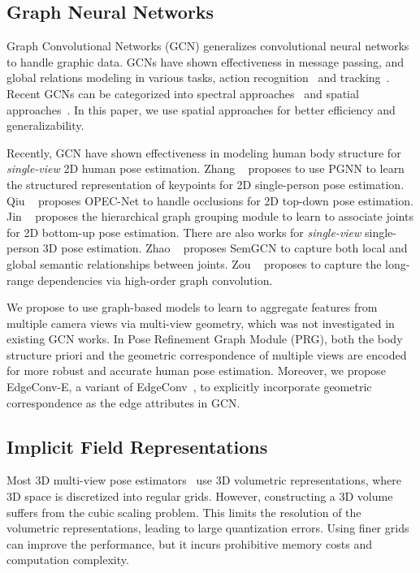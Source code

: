 \documentclass[10pt,twocolumn,letterpaper]{article}
\begin{document}
\subsection{Graph Neural Networks}

Graph Convolutional Networks (GCN) generalizes convolutional neural networks to handle graphic data. GCNs have shown effectiveness in message passing, and global relations modeling in various tasks, \eg action recognition~\cite{yan2018spatial} and tracking~\cite{gao2019graph}. Recent GCNs can be categorized into spectral approaches~\cite{bruna2013spectral,kipf2016semi} and spatial approaches~\cite{duvenaud2015convolutional,wang2019dynamic}. In this paper, we use spatial approaches for better efficiency and generalizability.

Recently, GCN have shown effectiveness in modeling human body structure for \emph{single-view} 2D human pose estimation. Zhang \etal~\cite{zhang2019human} proposes to use PGNN to learn the structured representation of keypoints for 2D single-person pose estimation. Qiu \etal~\cite{qiu2020peeking} proposes OPEC-Net to handle occlusions for 2D top-down pose estimation. Jin \etal~\cite{jin2020differentiable} proposes the hierarchical graph grouping module to learn to associate joints for 2D bottom-up pose estimation. There are also works for \emph{single-view} single-person 3D pose estimation. Zhao \etal~\cite{zhao2019semantic} proposes SemGCN to capture both local and global semantic relationships between joints. Zou \etal~\cite{zou2020high} proposes to capture the long-range dependencies via high-order graph convolution. 

We propose to use graph-based models to learn to aggregate features from multiple camera views via multi-view geometry, which was not investigated in existing GCN works. In Pose Refinement Graph Module (PRG), both the body structure priori and the geometric correspondence of multiple views are encoded for more robust and accurate human pose estimation. Moreover, we propose EdgeConv-E, a variant of EdgeConv~\cite{wang2019dynamic}, to explicitly incorporate geometric correspondence as the edge attributes in GCN. 


\subsection{Implicit Field Representations}

Most 3D multi-view pose estimators~\cite{amin2013multi,bridgeman2019multi,pavlakos2018ordinal,pavlakos2017coarse,tu2020voxelpose} use 3D volumetric representations, where 3D space is discretized into regular grids. However, constructing a 3D volume suffers from the cubic scaling problem. This limits the resolution of the volumetric representations, leading to large quantization errors. Using finer grids can improve the performance, but it incurs prohibitive memory costs and computation complexity.
\end{document}
